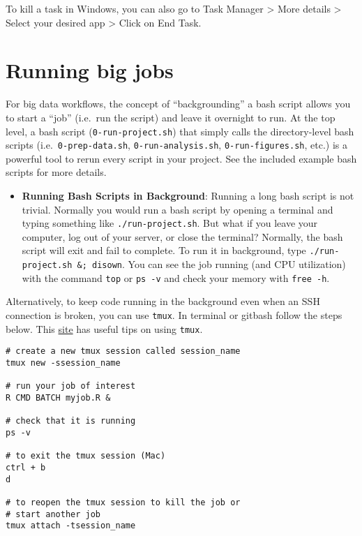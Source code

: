 \documentclass[
]{book}
\providecommand{\tightlist}{%
  \setlength{\itemsep}{0pt}\setlength{\parskip}{0pt}}
\begin{document}
To kill a task in Windows, you can also go to Task Manager \textgreater{} More details \textgreater{} Select your desired app \textgreater{} Click on End Task.

\hypertarget{running-big-jobs}{%
\section{Running big jobs}\label{running-big-jobs}}

For big data workflows, the concept of ``backgrounding'' a bash script allows you to start a ``job'' (i.e.~run the script) and leave it overnight to run. At the top level, a bash script (\texttt{0-run-project.sh}) that simply calls the directory-level bash scripts (i.e.~\texttt{0-prep-data.sh}, \texttt{0-run-analysis.sh}, \texttt{0-run-figures.sh}, etc.) is a powerful tool to rerun every script in your project. See the included example bash scripts for more details.

\begin{itemize}
\tightlist
\item
  \textbf{Running Bash Scripts in Background}: Running a long bash script is not trivial. Normally you would run a bash script by opening a terminal and typing something like \texttt{./run-project.sh}. But what if you leave your computer, log out of your server, or close the terminal? Normally, the bash script will exit and fail to complete. To run it in background, type \texttt{./run-project.sh\ \&;\ disown}. You can see the job running (and CPU utilization) with the command \texttt{top} or \texttt{ps\ -v} and check your memory with \texttt{free\ -h}.
\end{itemize}

Alternatively, to keep code running in the background even when an SSH connection is broken, you can use \texttt{tmux}. In terminal or gitbash follow the steps below. This \href{https://medium.com/@jeongwhanchoi/install-tmux-on-osx-and-basics-commands-for-beginners-be22520fd95e}{site} has useful tips on using \texttt{tmux}.

\begin{verbatim}
# create a new tmux session called session_name
tmux new -ssession_name

# run your job of interest
R CMD BATCH myjob.R & 
  
# check that it is running
ps -v

# to exit the tmux session (Mac)
ctrl + b 
d

# to reopen the tmux session to kill the job or 
# start another job
tmux attach -tsession_name 
\end{verbatim}
\end{document}

